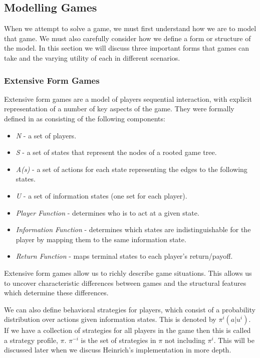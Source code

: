 \subsection{Modelling Games}\label{subsec:modellingGames}
When we attempt to solve a game, we must first understand how we are to model that game.
We must also carefully consider how we define a form or structure of the model\citep{myerson2013game}.
In this section we will discuss three important forms that games can take and the varying utility
of each in different scenarios.

\subsubsection{Extensive Form Games}
Extensive form games are a model of players sequential interaction, with explicit representation of a
number of key aspects of the game.
They were formally defined in\citep{kuhn2016extensive} as consisting of the following components:
\begin{itemize}
    \item \textit{N} - a set of players.
    \item \textit{S} - a set of states that represent the nodes of a rooted game tree.
    \item \textit{A(s)} - a set of actions for each state representing the edges to the following states.
    \item \textit{U} - a set of information states (one set for each player).
    \item \textit{Player Function} - determines who is to act at a given state.
    \item \textit{Information Function} - determines which states are indistinguishable for the player by mapping them to the same information state.
    \item \textit{Return Function} - maps terminal states to each player's return/payoff.
\end{itemize}

Extensive form games allow us to richly describe game situations.
This allows us to uncover characteristic differences between games and the structural features which
determine these differences\citep{kuhn2016extensive}.

We can also define behavioral strategies for players, which consist of a probability distribution over actions
given information states\citep{heinrich2017reinforcement}.
This is denoted by $\pi^i(a|u^i)$.
If we have a collection of strategies for all players in the game then this is called a strategy profile, $\pi$.
$\pi^{-i}$ is the set of strategies in $\pi$ not including $\pi^i$.
This will be discussed later when we discuss Heinrich's implementation in more depth.

